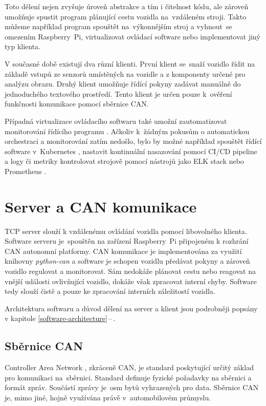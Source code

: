 \documentclass[czech, bachelor]{diploma}
\newcommand{\peteref}[1]{\ref{#1}\,--\,\nameref{#1}}
\begin{document}
Toto dělení nejen zvyšuje úroveň abstrakce a tím i čitelnost kódu, ale zároveň umožňuje spustit program plánující cestu vozidla
na~vzdáleném stroji. Takto můžeme například program spouštět na~výkonnějším stroj a vyhnout~se omezením Raspberry~Pi,
virtualizovat ovládací software nebo implementovat jiný typ klienta.

V současné době existují dva různí klienti. První klient se~snaží vozidlo řídit na základě vstupů ze senzorů umístěných na vozidle
a z komponenty určené pro analýzu obrazu. Druhý klient umožňuje řídící pokyny zadávat manuálně do jednoduchého textového
prostředí. Tento klient je určen pouze k~ověření funkčnosti komunikace pomocí sběrnice CAN.

Případná virtualizace ovládacího softwaru \cite{virtualization-source} také umožní zautomatizovat monitorování řídícího programu
\cite{prometheus-source, elk-source}. Ačkoliv k~žádným pokusům o automatickou orchestraci a monitorování zatím nedošlo, bylo by
možné například spouštět řídící software v~Kubernetes \cite{virtualization-source}, nastavit kontinuální nasazování pomocí CI/CD
pipeline \cite{cicd-source} a logy či metriky kontrolovat strojově pomocí nástrojů jako ELK stack \cite{elk-source} nebo 
Prometheus \cite{prometheus-source}.

\chapter{Server a CAN komunikace}

TCP server slouží k vzdálenému ovládání vozidla pomocí libovolného klienta. Software serveru je~spouštěn na zařízení Raspberry~Pi
připojeném k rozhrání CAN autonomní platformy. CAN komunikace je implementována za využití knihovny \emph{python-can} a software
je schopen vozidlu předávat pokyny a zároveň vozidlo regulovat a monitorovat. Sám nedokáže plánovat cestu nebo reagovat
na vnější události ovlivňující vozidlo, dokáže však zpracovat interní chyby. Software tedy slouží čistě a pouze ke zpracování
interních záležitostí vozidla.

Architektura softwaru a důvod dělení na server a klient jsou podrobněji popsány v kapitole \peteref{software-architecture}.

\section{Sběrnice CAN}

Controller Area Network \cite{can-source}, zkráceně CAN, je standard poskytující určitý základ pro komunikaci na~sběrnici.
Standard definuje fyzické požadavky na sběrnici a formát zpráv. Součástí zprávy je~osm bytů vyhrazených pro data. Sběrnice CAN je,
mimo jiné, hojně využívána právě v~automobilovém průmyslu.
\end{document}
